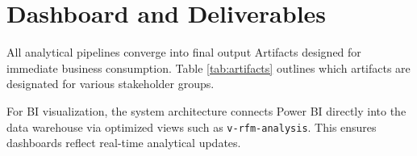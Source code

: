 \section{Dashboard and Deliverables}
All analytical pipelines converge into final output Artifacts designed for immediate business consumption. Table \ref{tab:artifacts} outlines which artifacts are designated for various stakeholder groups.



For BI visualization, the system architecture connects Power BI directly into the data warehouse via optimized views such as \texttt{v-rfm-analysis}. This ensures dashboards reflect real-time analytical updates.
\FloatBarrier
